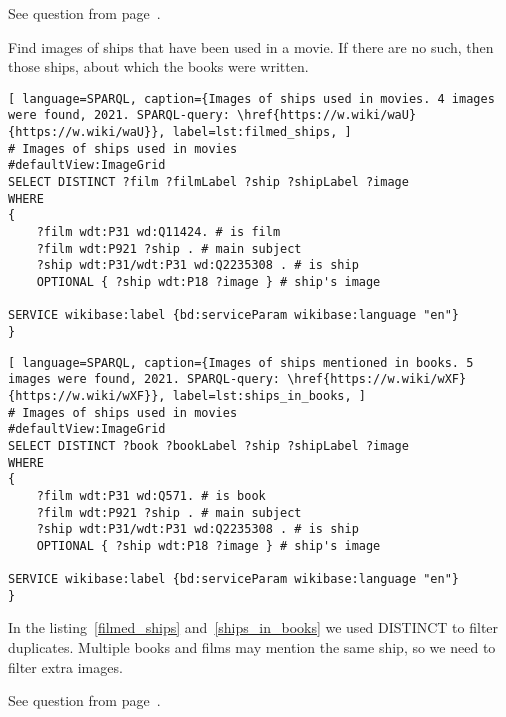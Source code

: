 \small{See question from page~\pageref{question:ship_2}.}


\begin{exercise}
	\label{answer:ship_3}
	Find images of ships that have been used in a movie. If there are no such, then those ships, about which the books were written.
\end{exercise}

\begin{lstlisting}[ language=SPARQL, caption={Images of ships used in movies. 4 images were found, 2021. SPARQL-query: \href{https://w.wiki/waU}{https://w.wiki/waU}}, label=lst:filmed_ships, ]
# Images of ships used in movies
#defaultView:ImageGrid
SELECT DISTINCT ?film ?filmLabel ?ship ?shipLabel ?image
WHERE
{
	?film wdt:P31 wd:Q11424. # is film	
	?film wdt:P921 ?ship . # main subject
	?ship wdt:P31/wdt:P31 wd:Q2235308 . # is ship
	OPTIONAL { ?ship wdt:P18 ?image } # ship's image
						
SERVICE wikibase:label {bd:serviceParam wikibase:language "en"}
}
\end{lstlisting}

\begin{lstlisting}[ language=SPARQL, caption={Images of ships mentioned in books. 5 images were found, 2021. SPARQL-query: \href{https://w.wiki/wXF}{https://w.wiki/wXF}}, label=lst:ships_in_books, ]
# Images of ships used in movies
#defaultView:ImageGrid
SELECT DISTINCT ?book ?bookLabel ?ship ?shipLabel ?image
WHERE
{
	?film wdt:P31 wd:Q571. # is book	
	?film wdt:P921 ?ship . # main subject
	?ship wdt:P31/wdt:P31 wd:Q2235308 . # is ship
	OPTIONAL { ?ship wdt:P18 ?image } # ship's image
										
SERVICE wikibase:label {bd:serviceParam wikibase:language "en"}
}
\end{lstlisting}

In the listing~\ref{filmed_ships} and~\ref{ships_in_books} we used DISTINCT to filter duplicates. Multiple books and films may mention the same ship, so we need to filter extra images.

\small{See question from page~\pageref{question:ship_3}.}


